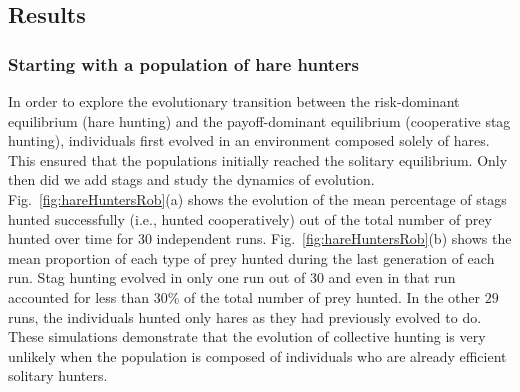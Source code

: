   \subsection{Results}
  \label{sec:results}
    \subsubsection{Starting with a population of hare hunters}
      In order to explore the evolutionary transition between the risk-dominant equilibrium (hare hunting) and the payoff-dominant equilibrium (cooperative stag hunting), individuals first evolved in an environment composed solely of hares. This ensured that the populations initially reached the solitary equilibrium. Only then did we add stags and study the dynamics of evolution. Fig.~\ref{fig:hareHuntersRob}(a) shows the evolution of the mean percentage of stags hunted successfully (i.e., hunted cooperatively) out of the total number of prey hunted over time for 30 independent runs. Fig.~\ref{fig:hareHuntersRob}(b) shows the mean proportion of each type of prey hunted during the last generation of each run. Stag hunting evolved in only one run out of $30$ and even in that run accounted for less than 30\% of the total number of prey hunted. In the other $29$ runs, the individuals hunted only hares as they had previously evolved to do. These simulations demonstrate that the evolution of collective hunting is very unlikely when the population is composed of individuals who are already efficient solitary hunters.

